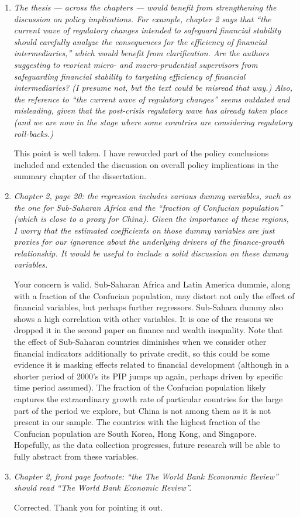 \begin{enumerate}
    \item \textit{The thesis --- across the chapters --- would benefit from strengthening the discussion on policy implications. For example, chapter 2 says that ``the current wave of regulatory changes intended to safeguard financial stability should carefully analyze the consequences for the efficiency of financial intermediaries,'' which would benefit from clarification. Are the authors suggesting to reorient micro- and macro-prudential supervisors from safeguarding financial stability to targeting efficiency of financial intermediaries? (I presume not, but the text could be misread that way.) Also, the reference to ``the current wave of regulatory changes'' seems outdated and misleading, given that the post-crisis regulatory wave has already taken place (and we are now in the stage where some countries are considering regulatory roll-backs.)}
    
    This point is well taken. I have reworded part of the policy conclusions included and extended the discussion on overall policy implications in the summary chapter of the dissertation.

    \item \textit{Chapter 2, page 20: the regression includes various dummy variables, such as the one for Sub-Saharan Africa and the ``fraction of Confucian population'' (which is close to a proxy for China). Given the importance of these regions, I worry that the estimated coefficients on those dummy variables are just proxies for our ignorance about the underlying drivers of the finance-growth relationship. It would be useful to include a solid discussion on these dummy variables.}
    
    Your concern is valid. Sub-Saharan Africa and Latin America dummie, along with a fraction of the Confucian population, may distort not only the effect of financial variables, but perhaps further regressors. Sub-Sahara dummy also shows a high correlation with other variables. It is one of the reasons we dropped it in the second paper on finance and wealth inequality. Note that the effect of Sub-Saharan countries diminishes when we consider other financial indicators additionally to private credit, so this could be some evidence it is masking effects related to financial development (although in a shorter period of 2000's its \ac{PIP} jumps up again, perhaps driven by specific time period assumed). The fraction of the Confucian population likely captures the extraordinary growth rate of particular countries for the large part of the period we explore, but China is not among them as it is not present in our sample. The countries with the highest fraction of the Confucian population are South Korea, Hong Kong, and Singapore. Hopefully, as the data collection progresses, future research will be able to fully abstract from these variables. 

    \item \textit{Chapter 2, front page footnote: ``the The World Bank Econonmic Review'' should read ``The World Bank Economic Review''.}
    
    Corrected. Thank you for pointing it out.
\end{enumerate}

\clearpage
\printbibliography[heading=subbibliography]
